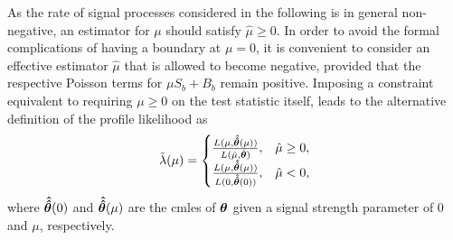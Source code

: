 As the rate of signal processes considered in the following is in general non-negative, an estimator for $\mu$ should satisfy $\hat{\mu}\geq 0$. In order to avoid the formal complications of having a boundary at $\mu = 0$, it is convenient to consider an effective estimator $\hat{\mu}$ that is allowed to become negative, provided that the respective Poisson terms for $\mu S_b + B_b$ remain positive. Imposing a constraint equivalent to requiring $\mu \geq 0$ on the test statistic itself, leads to the alternative definition of the profile likelihood as
\begin{equation}
	\tilde{\lambda}(\mu)= 
\begin{cases}
     \frac{L(\mu,\makemebold{\hat{\hat{\theta}}}(\mu))}{L(\hat{\mu},\hat{\makemebold{\theta}})}, & \hat{\mu} \geq 0,\\
     \frac{L(\mu,\makemebold{\hat{\hat{\theta}}}(\mu))}{L(0,\makemebold{\hat{\hat{\theta}}}(0))},              & \hat{\mu} < 0,
\end{cases}
\label{eq:lambda_tilde}
\end{equation}
where $\makemebold{\hat{\hat{\theta}}}(0)$ and $\makemebold{\hat{\hat{\theta}}}(\mu)$ are the \glspl{cmle} of $\makemebold{\theta}$ given a signal strength parameter of 0 and $\mu$, respectively. 

